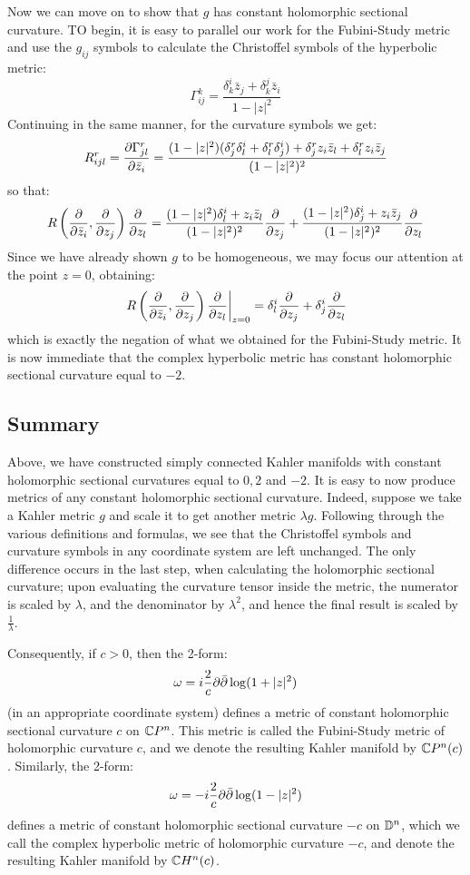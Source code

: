 Now we can move on to show that $g$ has constant holomorphic sectional curvature.  TO begin, it is easy to parallel our work for the Fubini-Study metric and use the $g_{ij}$ symbols to calculate the Christoffel symbols of the hyperbolic metric:
%
$$ \Gamma_{ij}^k = \frac{ \delta^i_k \bar{z}_j + \delta^j_k \bar{z}_i }{ 1 - |z|^2 } $$
%
Continuing in the same manner, for the curvature symbols we get:
%
$$ R_{ijl}^r = \frac{ \partial \Gamma_{jl}^r }{ \partial \bar{z}_i } = \frac{ ( 1 - |z|^2 )( \delta^r_j \delta^i_l + \delta^r_l \delta^i_j ) + \delta^r_j z_i \bar{z}_l + \delta^r_l z_i \bar{z}_j }{ ( 1 - |z|^2 )^2 } $$
%
so that:
%
$$ R \left( \frac{ \partial }{ \partial \bar{z}_i },\frac{ \partial }{ \partial z_j } \right) \frac{ \partial }{ \partial z_l } = \frac{ ( 1 - |z|^2 ) \delta^i_l + z_i \bar{z}_l }{ (1 - |z|^2)^2 } \frac{ \partial }{ \partial z_j } + \frac{ ( 1 - |z|^2 ) \delta^i_j + z_i \bar{z}_j }{ (1 - |z|^2)^2 } \frac{ \partial }{ \partial z_l } $$
%
Since we have already shown $g$ to be homogeneous, we may focus our attention at the point $z=0$, obtaining:
%
$$  \left. R \left( \frac{ \partial }{ \partial \bar{z}_i },\frac{ \partial }{ \partial z_j } \right) \frac{ \partial }{ \partial z_l } \right|_{z=0} =  \delta^i_l \frac{ \partial }{ \partial z_j } + \delta^i_j \frac{ \partial }{ \partial z_l } $$
%
which is exactly the negation of what we obtained for the Fubini-Study metric.  It is now immediate that the complex hyperbolic metric has constant holomorphic sectional curvature equal to $-2$.

\subsection{Summary}  
Above, we have constructed simply connected Kahler manifolds with constant holomorphic sectional curvatures equal to $0,2$ and $-2$.  It is easy to now produce metrics of any constant holomorphic sectional curvature.  Indeed, suppose we take a Kahler metric $g$ and scale it to get another metric $\lambda g$.  Following through the various definitions and formulas, we see that the Christoffel symbols and curvature symbols in any coordinate system are left unchanged.  The only difference occurs in the last step, when calculating the holomorphic sectional curvature; upon evaluating the curvature tensor inside the metric, the numerator is scaled by $\lambda$, and the denominator by $\lambda^2$, and hence the final result is scaled by $\frac{1}{\lambda}$.

Consequently, if $c > 0$, then the 2-form:
%
$$ \omega = i \frac{2}{c} \partial \bar{\partial} \log ( 1 + |z|^2 ) $$
%
(in an appropriate coordinate system) defines a metric of constant holomorphic sectional curvature $c$ on $\mathbb{C}P^n$.  This metric is called the Fubini-Study metric of holomorphic curvature $c$, and we denote the resulting Kahler manifold by $\mathbb{C}P^n(c)$.  Similarly, the 2-form:
%
$$ \omega = - i \frac{2}{c} \partial \bar{\partial} \log ( 1 - |z|^2 ) $$
%
defines a metric of constant holomorphic sectional curvature $-c$ on $\mathbb{D}^n$, which we call the complex hyperbolic metric of holomorphic curvature $-c$, and denote the resulting Kahler manifold by $\mathbb{C}H^n (c)$.

